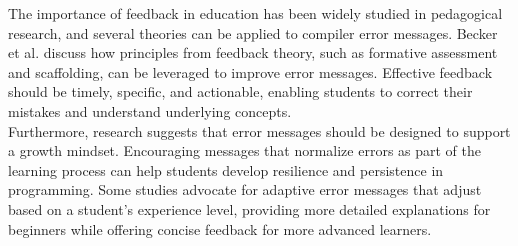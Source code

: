 The importance of feedback in education has been widely studied in pedagogical research, and several theories can be applied to compiler error messages.
Becker et al. discuss how principles from feedback theory, such as formative assessment and scaffolding, can be leveraged to improve error messages.
Effective feedback should be timely, specific, and actionable, enabling students to correct their mistakes and understand underlying concepts.\\[5pt]
Furthermore, research suggests that error messages should be designed to support a growth mindset.
Encouraging messages that normalize errors as part of the learning process can help students develop resilience and persistence in programming.
Some studies advocate for adaptive error messages that adjust based on a student's experience level,
providing more detailed explanations for beginners while offering concise feedback for more advanced learners.



